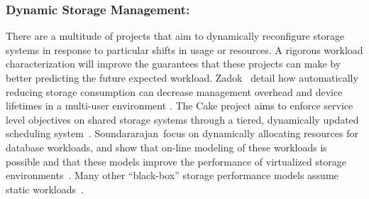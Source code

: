 \subsubsection*{Dynamic Storage Management: }
There are a multitude of projects that aim to dynamically reconfigure storage
systems in response to particular shifts in usage or resources.  A rigorous
workload characterization will improve the guarantees that these projects can
make by better predicting the future expected workload.  
Zadok \etal{}~detail how automatically reducing storage consumption 
can decrease management overhead and device lifetimes in a multi-user environment
\cite{zadok}.  
The Cake project aims to enforce service level objectives on shared storage
systems through a tiered, dynamically updated scheduling system~\cite{cake}.
Soundararajan~\etal focus on dynamically allocating resources for database
workloads, and show that on-line modeling of these workloads is possible and
that these models improve the performance of virtualized storage
environments~\cite{soundararajan2009dynamic}.  
Many other ``black-box'' storage performance models assume static
workloads~\cite{hippodrome,gulati2011pesto,kelly2004inducing,wang2004storage}.

%



